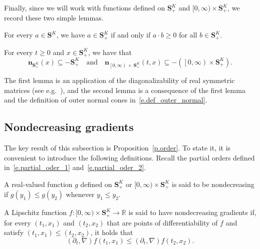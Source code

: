 \documentclass[AHL,Unicode,longabstracts,published]{cedram}
\newcommand{\R}{\mathbb{R}}
\renewcommand{\S}{\mathbf{S}}
\newcommand{\bfn}{\mathbf{n}}
\renewcommand{\leq}{\leqslant}
\renewcommand{\geq}{\geqslant}
\renewcommand{\subset}{\subseteq}
\begin{document}
Finally, since we will work with functions defined on $\S^K_+$ and $[0,\infty)\times \S^K_+$, we record these two simple lemmas.

\begin{lemm}\label{l.psd}
For every $a \in \S^K$, we have $a\in \S^K_+$ if and only if $a\cdot b \geq 0$ for all $b\in\S^K_+$.
\end{lemm}



\begin{lemm}\label{l.outer_normal}
For every $t\geq 0$ and $x \in \S^K_+$, we have that 
\[
\bfn_{\S^K_+}(x) \subset - \S^K_+\quad\text{and}\quad \bfn_{\left[0,\infty\right)\,\times\,\S^K_+}(t,x) \subset -\left(\left[0,\infty\right)\times \S^K_+\right).
\]
\end{lemm}

The first lemma is an application of the diagonalizability of real symmetric matrices (see e.g.~\cite[Lemma~2.2]{mourrat2019hamilton}), and the second lemma is a consequence of {the first lemma} and the definition of outer normal cones in~\eqref{e.def_outer_normal}.




\subsection{Nondecreasing gradients}
The key result of this subsection is Proposition~\ref{p.order}. To state it, it is convenient to introduce the following definitions. Recall the partial orders defined in~\eqref{e.partial_oder_1} and~\eqref{e.partial_oder_2}.


\begin{defi}[Nondecreasingness]\label{d.nondecreasing}
A real-valued function $g$ defined on $\S^K_+$ or $[0,\infty)\times \S^K_+$ is said to be nondecreasing if $g(y_1)\leq g(y_2)$ whenever $y_1\leq y_2$.
\end{defi}


\begin{defi}
A Lipschitz function $f:[0,\infty)\times \S^K_+\to \R$ is said to have nondecreasing gradients if, for every $(t_1,x_1)$ and $(t_2,x_2)$ that are {points of differentiability} of $f$ and satisfy $(t_1,x_1)\leq (t_2,x_2)$, it holds that
\begin{equation}\label{e.order}
\left(\partial_t,\nabla\right)f\left(t_1,x_1\right)\leq \left(\partial_t,\nabla\right)f\left(t_2,x_2\right).
\end{equation}
\end{defi}
\end{document}

